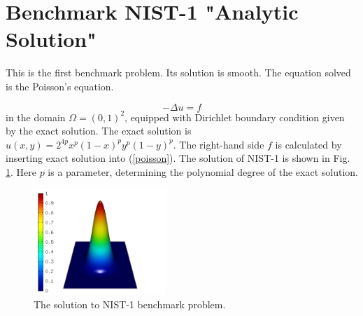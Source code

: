 \documentclass[12pt]{elsarticle}
\begin{document}

\section{Benchmark NIST-1 "Analytic Solution"}
\label{sec:bench-1}

This is the first benchmark problem. Its solution is smooth.
The equation solved is the Poisson's equation.

\begin{equation} \label{poisson}
-\Delta u = f
\end{equation}
in the domain $\Omega = (0, 1)^2$, equipped with Dirichlet
boundary condition given by the exact solution.
The exact solution is $u(x, y) = 2^{4p}x^{p}(1-x)^{p}y^{p}(1-y)^{p}$.
The right-hand side $f$ is calculated by inserting exact solution into (\ref{poisson}).
The solution of NIST-1 is shown in Fig. \ref{fig:sln-nist01}.
Here $p$ is a parameter, determining the polynomial degree of the exact solution.

\begin{figure}[!ht]
\centering
\includegraphics[height=4cm]{nist/nist-1/solution.png}
\caption{The solution to NIST-1 benchmark problem.}
\label{fig:sln-nist01}
\end{figure}
\end{document}
